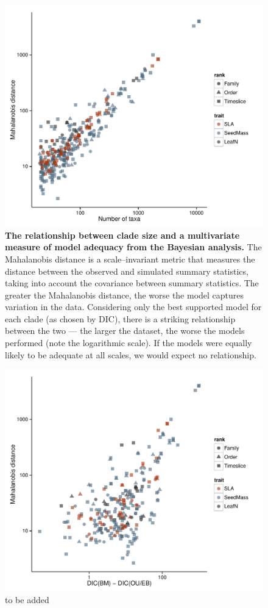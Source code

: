 \documentclass[a4paper,12pt]{article}
\begin{document}
\begin{figure}[p]
  \centering
  \includegraphics[scale=0.9]{figs/ad-size-bayes}
  \caption{\textbf{The relationship between clade size and a multivariate measure of model adequacy from the Bayesian analysis.} The Mahalanobis distance is a scale--invariant metric that measures the distance between the observed and simulated summary statistics, taking into account the covariance between summary statistics. The greater the Mahalanobis distance, the worse the model captures variation in the data. Considering only the best supported model for each clade (as chosen by DIC), there is a striking relationship between the two --- the larger the dataset, the worse the models performed (note the logarithmic scale). If the models were equally likely to be adequate at all scales, we would expect no relationship.}
  \label{fig:supp-size-adequacy}
\end{figure}

\begin{figure}[p]
  \centering
  \includegraphics[scale=0.9]{figs/ad-dic}
  \caption{to be added}
  \label{fig:supp-ad-dic}
\end{figure} 
\end{document}

